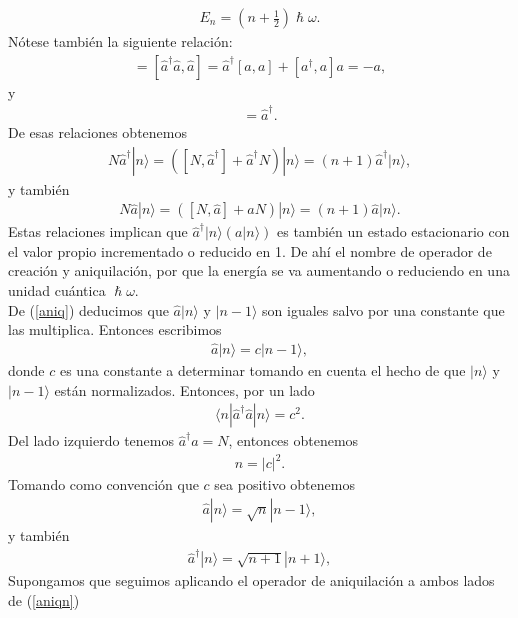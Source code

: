 \documentclass[letterpaper,12pt,oneside]{book}
\newcommand{\abs}[1]{\left\lvert#1\right\rvert}
\begin{document}
%
\begin{eqnarray}
E_n=\left(n+\frac{1}{2}\right)\hslash\omega.
\end{eqnarray}
%
N\'otese tambi\'en la siguiente relaci\'on:
%
\begin{eqnarray}
[N,\hat a]=[\hat a^\dagger \hat a,\hat a] = \hat a^\dagger [a,a]+[a^\dagger,a]a=-a,
\end{eqnarray}
%
y
%
\begin{eqnarray}
[N,\hat a^\dagger]=\hat a^\dagger.
\end{eqnarray}
%
De esas relaciones obtenemos
%
\begin{eqnarray}
N \hat a^\dagger|n\rangle = ([N,\hat a^\dagger]+\hat a^\dagger 	N)|n\rangle = (n+1)\hat a^\dagger|n\rangle\label{aniq},
\end{eqnarray}
%
y tambi\'en
%
\begin{eqnarray}
N\hat a|n\rangle = ([N,\hat a]+\hat a 	N)|n\rangle = (n+1)\hat a|n\rangle.
\end{eqnarray}
%
Estas relaciones implican que $\hat a^\dagger |n\rangle (a|n\rangle)$ es tambi\'en un estado estacionario con el valor propio incrementado o reducido en 1. De ah\'i el nombre de operador de creaci\'on y aniquilaci\'on, por que la energ\'ia se va aumentando o reduciendo en una unidad cu\'antica $\hslash\omega$.\\
De (\ref{aniq}) deducimos que $\hat a|n\rangle$ y $|n-1\rangle$ son iguales salvo por una constante que las multiplica. Entonces escribimos
%
\begin{eqnarray}
\hat a|n\rangle = c|n-1\rangle,
\end{eqnarray}
%
donde $c$ es una constante a determinar tomando en cuenta el hecho de que $|n\rangle$ y $|n-1\rangle$ est\'an normalizados. Entonces, por un lado
%
\begin{eqnarray}
\langle n|\hat a^\dagger \hat a|n \rangle= c^2.
\end{eqnarray}
%
Del lado izquierdo tenemos $\hat a^\dagger a = N$, entonces obtenemos
%
\begin{eqnarray}
n=\abs{c}^2.
\end{eqnarray}
%
Tomando como convenci\'on que $c$ sea positivo obtenemos
%
\begin{eqnarray}
\hat a|n\rangle = \sqrt{n}|n-1\rangle\label{aniqn},
\end{eqnarray}
%
y tambi\'en
%
\begin{eqnarray}
\hat a^\dagger|n\rangle = \sqrt{n+1}|n+1\rangle\label{aniqn1},
\end{eqnarray}
%
Supongamos que seguimos aplicando el operador de aniquilaci\'on a ambos lados de (\ref{aniqn})
\end{document}
